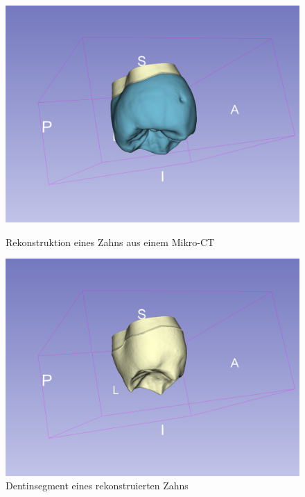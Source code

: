 \begin{figure}[h]
	\centering
	\begin{minipage}[b]{0.32\textwidth}
		\centering
		\includegraphics[width=\textwidth]{img/3dView.png}
		\caption{Rekonstruktion eines Zahns aus einem Mikro-CT}
		\label{fig:3d_view}
	\end{minipage}
	\hfill
	\begin{minipage}[b]{0.32\textwidth}
		\centering
		\includegraphics[width=\textwidth]{img/3dViewDentin.png}
		\caption{Dentinsegment eines rekonstruierten Zahns}
		\label{fig:3d_view_dentin}
	\end{minipage}
	\hfill
	\begin{minipage}[b]{0.32\textwidth}
		\centering

\end{minipage}
\end{figure}
